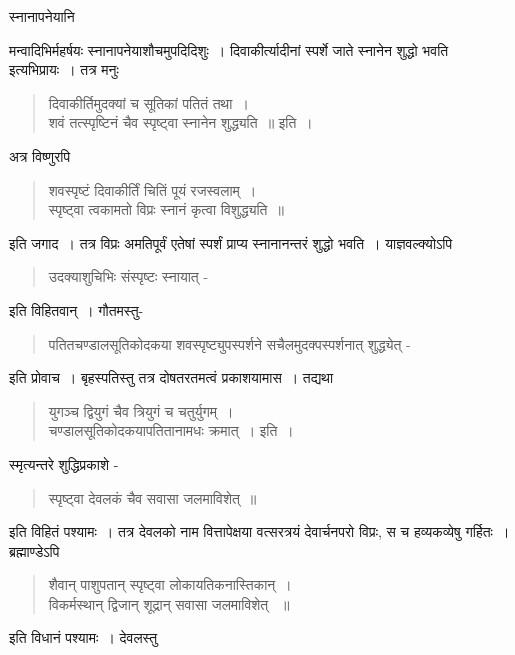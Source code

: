 {स्नानापनेयानि \

मन्वादिभिर्महर्षयः स्नानापनेयाशौचमुपदिदिशुः~। दिवाकीर्त्यादीनां स्पर्शे जाते स्नानेन शुद्धो भवति इत्यभिप्रायः~। तत्र मनुः 
\begin{verse}
दिवाकीर्तिमुदक्यां च सूतिकां पतितं तथा~। \\
शवं तत्स्पृष्टिनं चैव स्पृष्ट्वा स्नानेन शुद्ध्यति~॥ इति~। 
\end{verse}
अत्र विष्णुरपि 
\begin{verse}
शवस्पृष्टं दिवाकीर्तिं चितिं पूयं रजस्वलाम्~। \\
स्पृष्ट्वा त्वकामतो विप्रः स्नानं कृत्वा विशुद्ध्यति~॥ 
\end{verse}
इति जगाद~। तत्र विप्रः अमतिपूर्वं एतेषां स्पर्शं प्राप्य स्नानानन्तरं शुद्धो भवति~। याज्ञवल्क्योऽपि 
\begin{verse}
उदक्याशुचिभिः संस्पृष्टः स्नायात् -
\end{verse}
इति विहितवान्~। गौतमस्तु- 
\begin{verse}
पतितचण्डालसूतिकोदकया शवस्पृष्ट्युपस्पर्शने सचैलमुदक्पस्पर्शनात्  शुद्ध्येत् -
\end{verse}
इति प्रोवाच~। बृहस्पतिस्तु तत्र दोषतरतमत्वं प्रकाशयामास~। तद्यथा 
\begin{verse}
युगञ्च द्वियुगं चैव त्रियुगं च चतुर्युगम्~। \\
चण्डालसूतिकोदकयापतितानामधः क्रमात्~। इति~। 
\end{verse}
स्मृत्यन्तरे शुद्धिप्रकाशे - 
\begin{verse}
स्पृष्ट्वा देवलकं चैव सवासा जलमाविशेत्~॥
\end{verse}
इति विहितं पश्यामः~। तत्र देवलको नाम वित्तापेक्षया वत्सरत्रयं देवार्चनपरो विप्रः, स च हव्यकव्येषु गर्हितः~। ब्रह्माण्डेऽपि 
\begin{verse}
शैवान् पाशुपतान् स्पृष्ट्वा लोकायतिकनास्तिकान्~। \\
विकर्मस्थान् द्विजान् शूद्रान् सवासा जलमाविशेत् ~॥ 
\end{verse}

इति विधानं पश्यामः~।  देवलस्तु 

}
